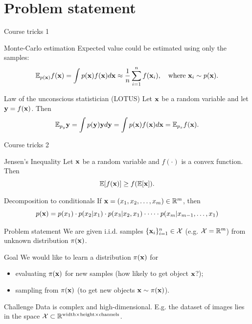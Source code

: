 \section{Problem statement}
\begin{frame}{Course tricks 1}
	\begin{block}{Monte-Carlo estimation}
		Expected value could be estimated using only the samples:
		\[
			\mathbb{E}_{p(\mathbf{x})} f(\mathbf{x}) = \int p(\mathbf{x}) f(\mathbf{x}) d \mathbf{x} \approx \frac{1}{n} \sum_{i=1}^n f(\mathbf{x}_i), \quad 
			\text{where } \mathbf{x}_i \sim p(\mathbf{x}).
		\]
	\end{block}
	\begin{block}{Law of the unconscious statistician (LOTUS)}
		Let $\mathbf{x}$ be a random variable and let $\mathbf{y}=f(\mathbf{x})$. Then
		\[
			\mathbb{E}_{p_y} \mathbf{y} = \int p(\mathbf{y}) \mathbf{y} d \mathbf{y} = \int p(\mathbf{x}) f(\mathbf{x}) d \mathbf{x} = \mathbb{E}_{p_x} f(\mathbf{x}).
		\]
	\end{block}
\end{frame}
\begin{frame}{Course tricks 2}
	\begin{block}{Jensen's Inequality}
		Let $\mathbf{x}$ be a random variable and $f(\cdot)$ is a convex function. Then
		\[
			\mathbb{E} [f(\mathbf{x})] \geq f(\mathbb{E}[\mathbf{x}]).
		\]
	\end{block}
	\begin{block}{Decomposition to conditionals}
	If $\mathbf{x} = (x_1, x_2, \dots, x_m) \in \mathbb{R}^m$, then 
	\[
		p(\mathbf{x}) = p(x_1) \cdot p(x_2 | x_1) \cdot p(x_3 | x_2, x_1) \cdot \dots \cdot p(x_m|x_{m-1},\dots,x_1)
	\]
	\end{block}
\end{frame}
\begin{frame}{Problem statement}
	We are given i.i.d. samples $\{\mathbf{x}_i\}_{i=1}^n \in \mathcal{X}$ (e.g. $\mathcal{X} = \mathbb{R}^m$) from unknown distribution $\pi(\mathbf{x})$.
	
	\begin{block}{Goal}
		We would like to learn a distribution $\pi(\mathbf{x})$ for 
		\begin{itemize}
		    \item evaluating $\pi(\mathbf{x})$ for new samples (how likely to get object $\mathbf{x}$?);
		    \item sampling from $\pi(\mathbf{x})$ (to get new objects $\mathbf{x} \sim \pi(\mathbf{x})$).
		\end{itemize}
	\end{block}
	\begin{block}{Challenge}
		 Data is complex and high-dimensional. E.g. the dataset of images lies in the space $\mathcal{X} \subset \mathbb{R}^{\text{width} \times \text{height} \times \text{channels}}$.
	\end{block}
\end{frame}
